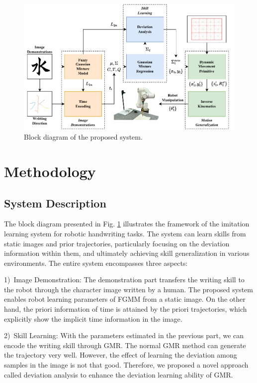 \documentclass[journal]{IEEEtran}
\begin{document}
\begin{figure}[!t]
    \centering
    \includegraphics[width=6in]{./fig/fig1.pdf}
    \caption{Block diagram of the proposed system.}
    \label{fig1}
\end{figure}

\section{Methodology}
\subsection{System Description}
The block diagram presented in Fig. \ref{fig1} illustrates the framework of the imitation learning system for robotic handwriting tasks. The system can learn skills from static images and prior trajectories, particularly focusing on the deviation information within them, and ultimately achieving skill generalization in various environments. The entire system encompasses three aspects:

1)~Image Demonstration: The demonstration part transfers the writing skill to the robot through the character image written by a human. The proposed system enables robot learning parameters of FGMM from a static image. On the other hand, the priori information of time is attained by the priori trajectories, which explicitly show the implicit time information in the image.

2)~Skill Learning: With the parameters estimated in the previous part, we can encode the writing skill through GMR. The normal GMR method can generate the trajectory very well. However, the effect of learning the deviation among samples in the image is not that good. Therefore, we proposed a novel approach called deviation analysis to enhance the deviation learning ability of GMR. 
\end{document}
